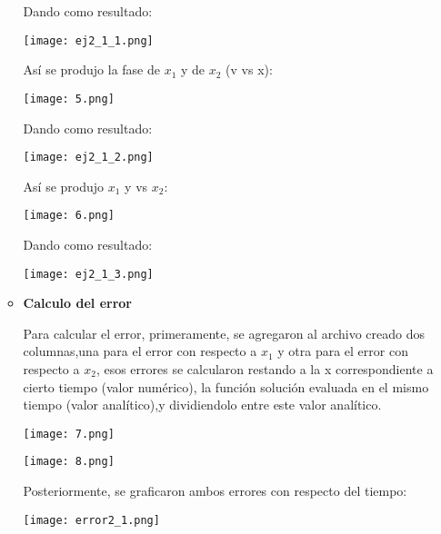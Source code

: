 \documentclass[12pt]{article}
\begin{document}
\begin{itemize}
\begin{itemize}
Dando como resultado:

\begin{center}
        \texttt{[image: ej2\_1\_1.png]}
\end{center}


Así se produjo la fase de $x_1$ y de $x_2$ (v vs x):

\begin{center}
        \texttt{[image: 5.png]}
\end{center}

Dando como resultado:

\begin{center}
        \texttt{[image: ej2\_1\_2.png]}
\end{center}

Así se produjo $x_1$ y vs $x_2$:

\begin{center}
        \texttt{[image: 6.png]}
\end{center}

Dando como resultado:


\begin{center}
        \texttt{[image: ej2\_1\_3.png]}
\end{center}

\item \textbf{Calculo del error}

Para calcular el error, primeramente, se agregaron al archivo creado dos columnas,una para el error con respecto a $x_1$ y otra para el error con respecto a $x_2$, esos errores se calcularon restando a la x correspondiente a cierto tiempo (valor numérico), la función solución evaluada en el mismo tiempo (valor analítico),y dividiendolo entre este valor analítico. 


\begin{center}
        \texttt{[image: 7.png]}
\end{center}

\begin{center}
        \texttt{[image: 8.png]}
\end{center}

Posteriormente, se graficaron ambos errores con respecto del tiempo:

\begin{center}
        \texttt{[image: error2\_1.png]}
\end{center}

\end{itemize}


\end{itemize}
\end{document}
